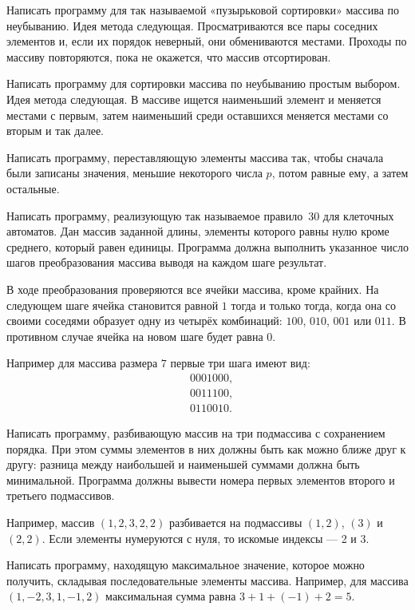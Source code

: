 \task Написать программу для так называемой «пузырьковой сортировки»
массива по неубыванию. Идея метода следующая. Просматриваются все пары
соседних элементов и, если их порядок неверный, они обмениваются
местами. Проходы по массиву повторяются, пока не окажется, что массив
отсортирован.

\task Написать программу для сортировки массива по неубыванию простым
выбором. Идея метода следующая. В массиве ищется наименьший элемент и
меняется местами с первым, затем наименьший среди оставшихся меняется
местами со вторым и так далее.

\task Написать программу, переставляющую элементы массива так, чтобы
сначала были записаны значения, меньшие некоторого числа $p$, потом
равные ему, а затем остальные.

\task Написать программу, реализующую так называемое правило~30 для
клеточных автоматов. Дан массив заданной длины, элементы которого
равны нулю кроме среднего, который равен единицы. Программа должна
выполнить указанное число шагов преобразования массива выводя на
каждом шаге результат.

В ходе преобразования проверяются все ячейки массива, кроме
крайних. На следующем шаге ячейка становится равной $1$ тогда и только
тогда, когда она со своими соседями образует одну из четырёх
комбинаций: $100$, $010$, $001$ или $011$. В противном случае ячейка
на новом шаге будет равна $0$.

Например для массива размера $7$ первые три шага имеют вид:
\begin{eqnarray*}
&0001000,\\
&0011100,\\
&0110010.
\end{eqnarray*}

\task Написать программу, разбивающую массив на три подмассива с
сохранением порядка. При этом суммы элементов в них должны быть как
можно ближе друг к другу: разница между наибольшей и наименьшей
суммами должна быть минимальной. Программа должны вывести номера
первых элементов второго и третьего подмассивов.

Например, массив $(1, 2, 3, 2, 2)$ разбивается на подмассивы $(1, 2)$,
$(3)$ и $(2, 2).$ Если элементы нумеруются с нуля, то искомые индексы
— 2 и 3.

\task Написать программу, находящую максимальное значение, которое
можно получить, складывая последовательные элементы массива. Например,
для массива $(1, -2, 3, 1, -1, 2)$ максимальная сумма равна
$3+1+(-1)+2=5$.

